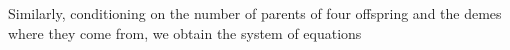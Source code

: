 \documentclass[11pt]{article}
\begin{document}
Similarly, conditioning on  the number of parents of four offspring and the demes where they come from, 
we obtain the system of equations
\end{document}
